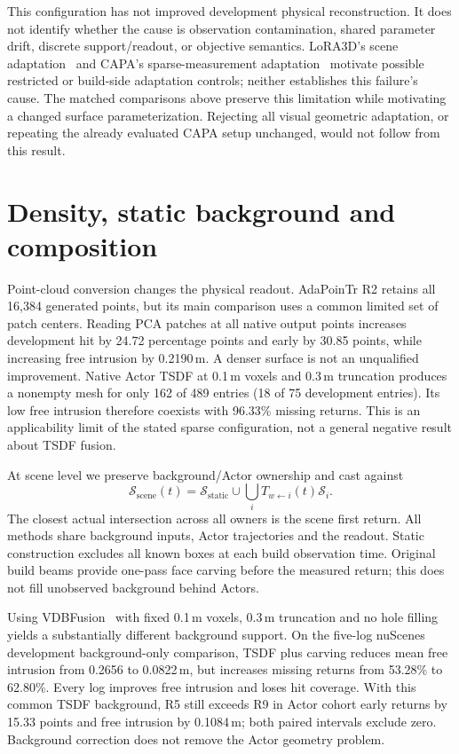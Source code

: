 \documentclass[10pt,a4paper]{article}
\begin{document}
This configuration has not improved development physical reconstruction.
It does not identify whether the cause is observation contamination, shared
parameter drift, discrete support/readout, or objective semantics. LoRA3D's
scene adaptation~\cite{lora3d} and CAPA's sparse-measurement adaptation~\cite{capa}
motivate possible restricted or build-side adaptation controls; neither
establishes this failure's cause. The matched comparisons above preserve this
limitation while motivating a changed surface parameterization. Rejecting all visual geometric adaptation, or repeating
the already evaluated CAPA setup unchanged, would not follow from this result.

\section{Density, static background and composition}
Point-cloud conversion changes the physical readout. AdaPoinTr R2 retains all
16,384 generated points, but its main comparison uses a common limited set of
patch centers. Reading PCA patches at all native output points increases
development hit by 24.72 percentage points and early by 30.85 points, while
increasing free intrusion by 0.2190\,m. A denser surface is not an unqualified
improvement. Native Actor TSDF at 0.1\,m voxels and 0.3\,m truncation produces
a nonempty mesh for only 162 of 489 entries (18 of 75 development entries).
Its low free intrusion therefore coexists with 96.33\% missing returns.
This is an applicability limit of the stated sparse configuration, not a
general negative result about TSDF fusion.

At scene level we preserve background/Actor ownership and cast against
\begin{equation}
 \mathcal S_{\mathrm{scene}}(t)=\mathcal S_{\mathrm{static}}
      \cup\bigcup_i T_{w\leftarrow i}(t)\mathcal S_i.
\end{equation}
The closest actual intersection across all owners is the scene first return.
All methods share background inputs, Actor trajectories and the readout.
Static construction excludes all known boxes at each build observation time.
Original build beams provide one-pass face carving before the measured return;
this does not fill unobserved background behind Actors.

Using VDBFusion~\cite{vdbfusion} with fixed 0.1\,m voxels, 0.3\,m truncation and
no hole filling yields a substantially different background support. On the
five-log nuScenes development background-only comparison, TSDF plus carving
reduces mean free intrusion from 0.2656 to 0.0822\,m, but increases missing
returns from 53.28\% to 62.80\%. Every log improves free intrusion and loses
hit coverage. With this common TSDF background, R5 still exceeds R9 in Actor
cohort early returns by 15.33 points and free intrusion by 0.1084\,m; both
paired intervals exclude zero. Background correction does not remove the
Actor geometry problem.
\end{document}
